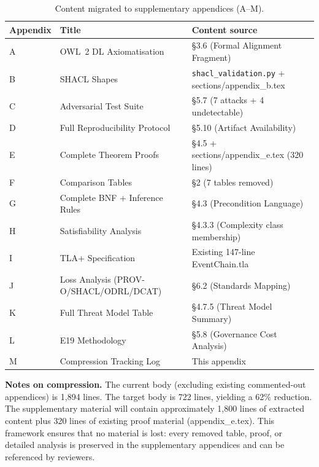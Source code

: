 \begin{table}[htbp]
\centering
\small
\caption{Content migrated to supplementary appendices (A--M).}
\label{tab:appendix-migration}
\begin{tabular}{@{}llp{6cm}@{}}
\toprule
\textbf{Appendix} & \textbf{Title} & \textbf{Content source} \\
\midrule
A & OWL~2 DL Axiomatisation & \S3.6 (Formal Alignment Fragment) \\
B & SHACL Shapes & \texttt{shacl\_validation.py} + sections/appendix\_b.tex \\
C & Adversarial Test Suite & \S5.7 (7 attacks + 4 undetectable) \\
D & Full Reproducibility Protocol & \S5.10 (Artifact Availability) \\
E & Complete Theorem Proofs & \S4.5 + sections/appendix\_e.tex (320 lines) \\
F & Comparison Tables & \S2 (7 tables removed) \\
G & Complete BNF + Inference Rules & \S4.3 (Precondition Language) \\
H & Satisfiability Analysis & \S4.3.3 (Complexity class membership) \\
I & TLA+ Specification & Existing 147-line EventChain.tla \\
J & Loss Analysis (PROV-O/SHACL/ODRL/DCAT) & \S6.2 (Standards Mapping) \\
K & Full Threat Model Table & \S4.7.5 (Threat Model Summary) \\
L & E19 Methodology & \S5.8 (Governance Cost Analysis) \\
M & Compression Tracking Log & This appendix \\
\bottomrule
\end{tabular}
\end{table}

\textbf{Notes on compression.} The current body (excluding existing commented-out appendices) is 1,894 lines. The target body is 722 lines, yielding a 62\% reduction. The supplementary material will contain approximately 1,800 lines of extracted content plus 320 lines of existing proof material (appendix\_e.tex). This framework ensures that no material is lost: every removed table, proof, or detailed analysis is preserved in the supplementary appendices and can be referenced by reviewers.
